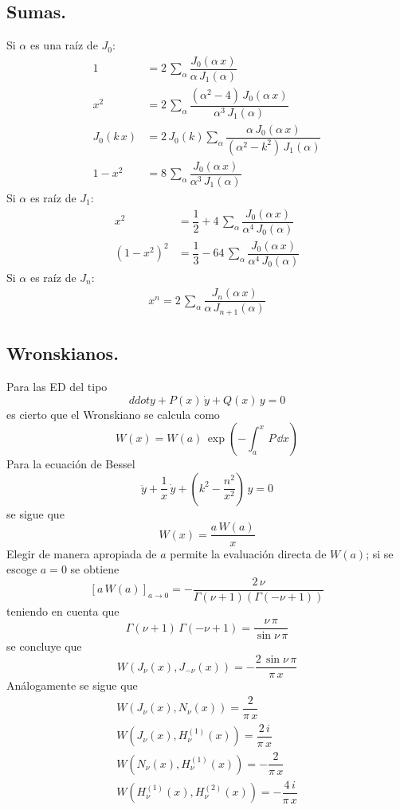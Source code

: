 \subsection{Sumas.}
Si $\alpha$ es una raíz de $J_{0}$:
\begin{align*}
1 &= 2 \, \sum_{\alpha} \dfrac{J_{0} (\alpha \, x)}{\alpha \, J_{1} (\alpha)} \\
x^{2} &= 2 \, \sum_{\alpha} \dfrac{(\alpha^{2}- 4) \, J_{0} (\alpha \, x)}{\alpha^{3} \, J_{1} (\alpha)} \\
J_{0} (k \, x) &= 2 \, J_{0} (k) \sum_{\alpha} \dfrac{\alpha \, J_{0} (\alpha \, x)}{(\alpha^{2} - k^{2}) \, J_{1}(\alpha)} \\
1 -x^{2} &= 8 \, \sum_{\alpha} \dfrac{J_{0}(\alpha \, x)}{\alpha^{3} \, J_{1} (\alpha)}
\end{align*}
Si $\alpha$ es raíz de $J_{1}$:
\begin{align*}
x^{2} &= \dfrac{1}{2} + 4 \, \sum_{\alpha} \dfrac{J_{0} (\alpha \, x)}{\alpha^{4} \, J_{0} (\alpha)} \\
(1 - x^{2})^{2} &= \dfrac{1}{3} - 64 \, \sum_{\alpha} \dfrac{J_{0} (\alpha \, x)}{\alpha^{4} \, J_{0} (\alpha)}
\end{align*}
Si $\alpha$ es raíz de $J_{n}$:
\begin{align*}
x^{n} = 2 \, \sum_{\alpha} \dfrac{J_{n} (\alpha \, x)}{\alpha \, J_{n+1} (\alpha)}
\end{align*}
\subsection{Wronskianos.}
Para las ED del tipo
\[ ddot{y} + P(x) \, \dot{y} + Q(x) \, y = 0 \]
es cierto que el Wronskiano se calcula como
\[ W(x) = W(a) \, \exp(- \int_{a}^{x} \, P \, \dd x) \]
Para la ecuación de Bessel
\[  \ddot{y} + \dfrac{1}{x} \, \dot{y} + (k^{2} - \dfrac{n^{2}}{x^{2}}) \, y = 0 \]
se sigue que
\[ W(x) = \dfrac{a \, W(a)}{x} \]
Elegir de manera apropiada de $a$ permite la evaluación directa de $W(a)$; si se escoge $a=0$ se obtiene
\[ [a \, W(a)]_{a \to 0} =  - \dfrac{2 \, \nu}{\Gamma(\nu + 1)(\Gamma (-\nu +1))} \]
teniendo en cuenta que
\[ \Gamma (\nu + 1) \, \Gamma (-\nu + 1) = \dfrac{\nu \, \pi}{\sin \nu \,\pi } \]
se concluye que
\[ W (J_{\nu} (x), J_{-\nu} (x)) = - \dfrac{2 \, \sin \nu \, \pi}{\pi \, x} \]
Análogamente se sigue que
\begin{align*}
W (J_{\nu} (x), N_{\nu} (x)) = \dfrac{2}{\pi \, x} \\[1em]
W (J_{\nu} (x), H_{\nu}^{(1)} (x)) =  \dfrac{2 \, i}{\pi \, x} \\[1em]
W (N_{\nu} (x), H_{\nu}^{(1)} (x)) = - \dfrac{2}{\pi \, x} \\[1em]
W (H_{\nu}^{(1)} (x), H_{\nu}^{(2)} (x)) = - \dfrac{4 \, i}{\pi \, x}
\end{align*}

